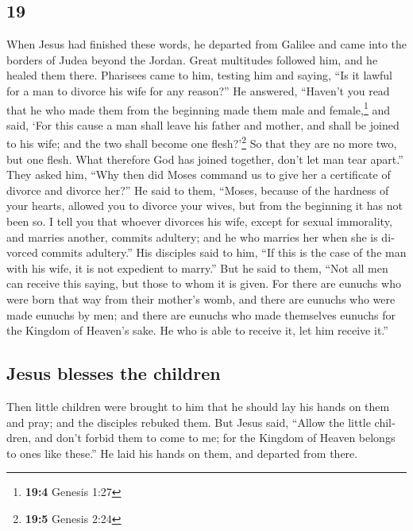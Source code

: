 \begin{paracol}{2}
\begin{otherlanguage}{english}
\hypertarget{section-37}{%
\section{19}\label{section-37}}

 When Jesus had finished these words, he departed from
Galilee and came into the borders of Judea beyond the Jordan.
 Great multitudes followed him, and he healed them there.
 Pharisees came to him, testing him and saying, ``Is it
lawful for a man to divorce his wife for any reason?''  He
answered, ``Haven't you read that he who made them from the beginning
made them male and female,\footnote{\textbf{19:4} Genesis 1:27}
 and said, `For this cause a man shall leave his father
and mother, and shall be joined to his wife; and the two shall become
one flesh?'\footnote{\textbf{19:5} Genesis 2:24}  So that
they are no more two, but one flesh. What therefore God has joined
together, don't let man tear apart.''  They asked him,
``Why then did Moses command us to give her a certificate of divorce and
divorce her?''  He said to them, ``Moses, because of the
hardness of your hearts, allowed you to divorce your wives, but from the
beginning it has not been so.  I tell you that whoever
divorces his wife, except for sexual immorality, and marries another,
commits adultery; and he who marries her when she is divorced commits
adultery.''  His disciples said to him, ``If this is the
case of the man with his wife, it is not expedient to marry.''
 But he said to them, ``Not all men can receive this
saying, but those to whom it is given.  For there are
eunuchs who were born that way from their mother's womb, and there are
eunuchs who were made eunuchs by men; and there are eunuchs who made
themselves eunuchs for the Kingdom of Heaven's sake. He who is able to
receive it, let him receive it.''

\hypertarget{jesus-blesses-the-children}{%
\subsection{Jesus blesses the
children}\label{jesus-blesses-the-children}}

 Then little children were brought to him that he should
lay his hands on them and pray; and the disciples rebuked them.
 But Jesus said, ``Allow the little children, and don't
forbid them to come to me; for the Kingdom of Heaven belongs to ones
like these.''  He laid his hands on them, and departed
from there.


\end{otherlanguage}
\end{paracol}
